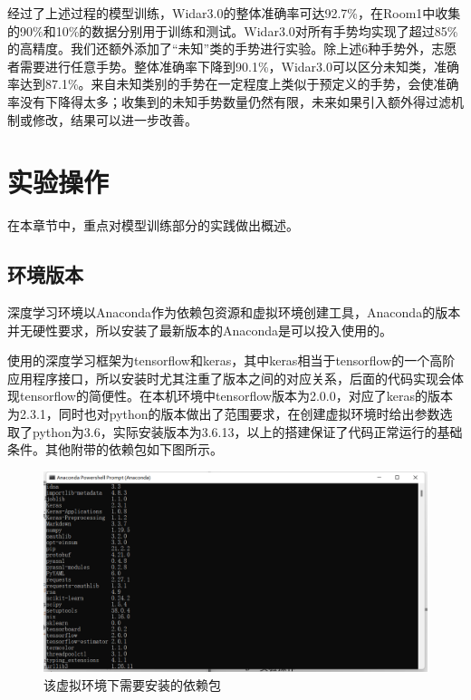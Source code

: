 \documentclass[a4paper]{article}
\begin{document}
  经过了上述过程的模型训练，Widar3.0的整体准确率可达92.7\%，在Room1中收集的90\%和10\%的数据分别用于训练和测试。Widar3.0对所有手势均实现了超过85\%的高精度。我们还额外添加了“未知”类的手势进行实验。除上述6种手势外，志愿者需要进行任意手势。整体准确率下降到90.1\%，Widar3.0可以区分未知类，准确率达到87.1\%。来自未知类别的手势在一定程度上类似于预定义的手势，会使准确率没有下降得太多；收集到的未知手势数量仍然有限，未来如果引入额外得过滤机制或修改，结果可以进一步改善。

  \clearpage
  \section{实验操作}
  在本章节中，重点对模型训练部分的实践做出概述。
  \subsection{环境版本}
  深度学习环境以Anaconda作为依赖包资源和虚拟环境创建工具，Anaconda的版本并无硬性要求，所以安装了最新版本的Anaconda是可以投入使用的。 \par
  使用的深度学习框架为tensorflow和keras，其中keras相当于tensorflow的一个高阶应用程序接口，所以安装时尤其注重了版本之间的对应关系，后面的代码实现会体现tensorflow的简便性。在本机环境中tensorflow版本为2.0.0，对应了keras的版本为2.3.1，同时也对python的版本做出了范围要求，在创建虚拟环境时给出参数选取了python为3.6，实际安装版本为3.6.13，以上的搭建保证了代码正常运行的基础条件。其他附带的依赖包如下图所示。 \par
  \begin{figure}[H]
    \centering
    \includegraphics[width=16cm]{images/package.png}
    \caption{该虚拟环境下需要安装的依赖包}
    \label{fig1}
  \end{figure}
  
\end{document}
